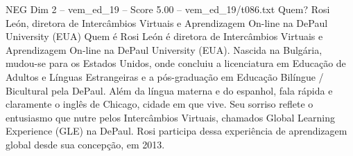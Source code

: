 \begin{textsample}{NEG Dim 2 – vem\_ed\_19 – Score 5.00 – vem\_ed\_19/t086.txt}  \label{ex:f2_neg_179}
Quem?
Rosi León, diretora de Intercâmbios Virtuais e Aprendizagem On-line na DePaul University (EUA) Quem é Rosi León é diretora de Intercâmbios Virtuais e Aprendizagem On-line na DePaul University (EUA).
Nascida na Bulgária, mudou-se para os Estados Unidos, onde concluiu a licenciatura em Educação de Adultos e Línguas Estrangeiras e a pós-graduação em Educação Bilíngue / Bicultural pela DePaul.
Além da língua materna e do espanhol, fala rápida e claramente o inglês de Chicago, cidade em que vive.
Seu sorriso reflete o entusiasmo que nutre pelos Intercâmbios Virtuais, chamados Global Learning Experience (GLE) na DePaul.
Rosi participa dessa experiência de aprendizagem global desde sua concepção, em 2013.

\end{textsample}
